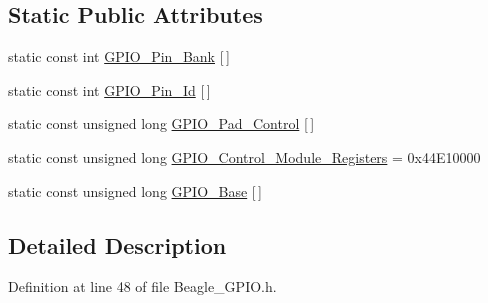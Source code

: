 \subsection*{\-Static \-Public \-Attributes}
\begin{DoxyCompactItemize}
\item 
static const int \hyperlink{class_beagle___g_p_i_o_ae7919c981429a17c48c601664a61d64a}{\-G\-P\-I\-O\-\_\-\-Pin\-\_\-\-Bank} \mbox{[}$\,$\mbox{]}
\item 
static const int \hyperlink{class_beagle___g_p_i_o_a9a48339b54de8e6c884ddad8629a3647}{\-G\-P\-I\-O\-\_\-\-Pin\-\_\-\-Id} \mbox{[}$\,$\mbox{]}
\item 
static const unsigned long \hyperlink{class_beagle___g_p_i_o_ae4a0a2a56a0ba31145a5f41eb3439886}{\-G\-P\-I\-O\-\_\-\-Pad\-\_\-\-Control} \mbox{[}$\,$\mbox{]}
\item 
static const unsigned long \hyperlink{class_beagle___g_p_i_o_a45dea13988842b47f592806fd15f1262}{\-G\-P\-I\-O\-\_\-\-Control\-\_\-\-Module\-\_\-\-Registers} = 0x44\-E10000
\item 
static const unsigned long \hyperlink{class_beagle___g_p_i_o_ab259232b938bf1892836737c07610384}{\-G\-P\-I\-O\-\_\-\-Base} \mbox{[}$\,$\mbox{]}
\end{DoxyCompactItemize}


\subsection{\-Detailed \-Description}


\-Definition at line 48 of file \-Beagle\-\_\-\-G\-P\-I\-O.\-h.



